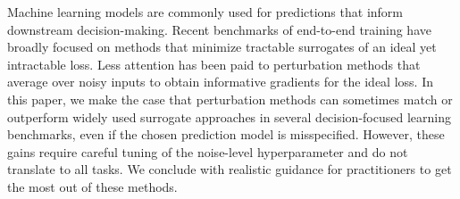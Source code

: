 Machine learning models are commonly used for predictions that inform downstream decision-making.
  Recent benchmarks of end-to-end training have broadly focused on methods that minimize tractable surrogates of an ideal yet intractable loss. Less attention has been paid to perturbation methods that average over noisy inputs to obtain informative gradients for the ideal loss.
  In this paper, we make the case that perturbation methods can sometimes match or outperform widely used surrogate approaches in several decision-focused learning benchmarks, even if the chosen prediction model is misspecified.
  However, these gains require careful tuning of the noise-level hyperparameter and do not translate to all tasks. We conclude with realistic guidance for practitioners to get the most out of these methods.

